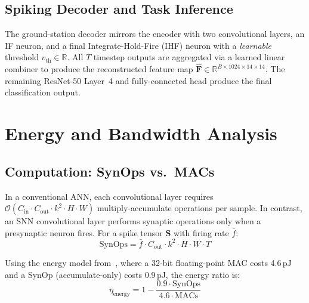 \documentclass[conference]{IEEEtran}
\begin{document}
\subsection{Spiking Decoder and Task Inference}

The ground-station decoder mirrors the encoder with two convolutional layers, an IF neuron, and a final Integrate-Hold-Fire (IHF) neuron with a \emph{learnable} threshold $v_{\text{th}} \in \mathbb{R}$. All $T$ timestep outputs are aggregated via a learned linear combiner to produce the reconstructed feature map $\hat{\mathbf{F}} \in \mathbb{R}^{B \times 1024 \times 14 \times 14}$. The remaining ResNet-50 Layer~4 and fully-connected head produce the final classification output.

\section{Energy and Bandwidth Analysis}
\label{sec:energy}

\subsection{Computation: SynOps vs.\ MACs}

In a conventional ANN, each convolutional layer requires $\mathcal{O}(C_{\text{in}} \cdot C_{\text{out}} \cdot k^2 \cdot H \cdot W)$ multiply-accumulate operations per sample. In contrast, an SNN convolutional layer performs synaptic operations only when a presynaptic neuron fires. For a spike tensor $\mathbf{S}$ with firing rate $\bar{f}$:
\begin{equation}
    \text{SynOps} = \bar{f} \cdot C_{\text{out}} \cdot k^2 \cdot H \cdot W \cdot T
    \label{eq:synops}
\end{equation}

Using the energy model from~\cite{horowitz2014energy}, where a 32-bit floating-point MAC costs 4.6\,pJ and a SynOp (accumulate-only) costs 0.9\,pJ, the energy ratio is:
\begin{equation}
    \eta_{\text{energy}} = 1 - \frac{0.9 \cdot \text{SynOps}}{4.6 \cdot \text{MACs}}
    \label{eq:energy_ratio}
\end{equation}
\end{document}
